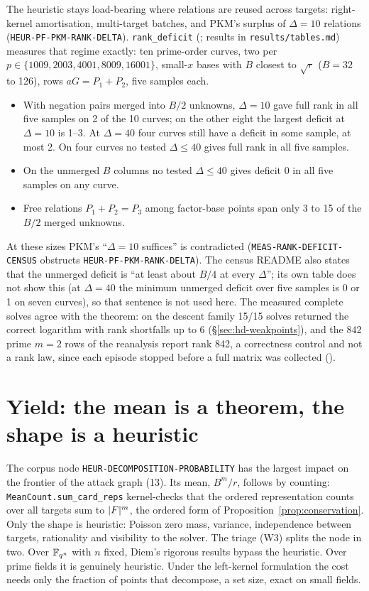 The heuristic stays load-bearing where relations are reused across targets:
right-kernel amortisation, multi-target batches, and PKM's surplus of
$\Delta=10$ relations (\texttt{HEUR-PF-PKM-RANK-DELTA}).
\texttt{rank\_deficit}
(;
results in \texttt{results/tables.md}) measures that regime exactly: ten
prime-order curves, two per $p\in\{1009,2003,4001,8009,16001\}$, small-$x$
bases with $B$ closest to $\sqrt r$ ($B=32$ to 126), rows $aG=P_1+P_2$, five
samples each.
\begin{itemize}
\item With negation pairs merged into $B/2$ unknowns, $\Delta=10$ gave full
  rank in all five samples on 2 of the 10 curves; on the other eight the
  largest deficit at $\Delta=10$ is 1--3. At $\Delta=40$ four curves still
  have a deficit in some sample, at most 2. On four curves no tested
  $\Delta\le40$ gives full rank in all five samples.
\item On the unmerged $B$ columns no tested $\Delta\le40$ gives deficit 0 in
  all five samples on any curve.
\item Free relations $P_1+P_2=P_3$ among factor-base points span only 3 to
  15 of the $B/2$ merged unknowns.
\end{itemize}
At these sizes PKM's ``$\Delta=10$ suffices'' is contradicted
(\texttt{MEAS-RANK-DEFICIT-CENSUS} obstructs \texttt{HEUR-PF-PKM-RANK-DELTA}).
The census README also states that the unmerged deficit is ``at least about
$B/4$ at every $\Delta$''; its own table does not show this (at $\Delta=40$
the minimum unmerged deficit over five samples is 0 or 1 on seven curves), so
that sentence is not used here. The measured complete solves agree with the
theorem: on the descent family 15/15 solves returned the correct logarithm
with rank shortfalls up to 6 (\S\ref{sec:hd-weakpoints}), and the 842 prime
$m=2$ rows of the reanalysis report rank 842, a correctness control and not
a rank law, since each episode stopped before a full matrix was collected
().

\section{Yield: the mean is a theorem, the shape is a heuristic}\label{sec:hd-yield}

The corpus node \texttt{HEUR-DECOMPOSITION-PROBABILITY} has the largest
impact on the frontier of the attack graph (13). Its mean, $B^m/r$, follows
by counting: \texttt{MeanCount.sum\_card\_reps} kernel-checks that the
ordered representation counts over all targets sum to $\lvert F \rvert^m$, the
ordered form of Proposition~\ref{prop:conservation}. Only the shape is
heuristic: Poisson zero mass, variance, independence between targets,
rationality and visibility to the solver. The triage (W3) splits the node in
two. Over $\mathbb{F}_{q^n}$ with $n$ fixed, Diem's rigorous results bypass the
heuristic. Over prime fields it is genuinely heuristic. Under the
left-kernel formulation the cost needs only the fraction of points that
decompose, a set size, exact on small fields.

